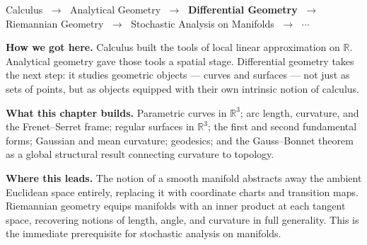 
\begin{tcolorbox}[
  colback=gray!6,
  colframe=gray!40,
  arc=2pt,
  left=8pt, right=8pt, top=6pt, bottom=6pt,
  title={\small\textbf{Where You Are in the Journey}},
  fonttitle=\small\bfseries
]
\begin{center}
\small
Calculus
$\;\to\;$ Analytical Geometry
$\;\to\;$ \textbf{Differential Geometry}
$\;\to\;$ Riemannian Geometry
$\;\to\;$ Stochastic Analysis on Manifolds
$\;\to\;$ $\cdots$
\end{center}

\medskip
\noindent\textbf{How we got here.}
Calculus built the tools of local linear approximation on
$\mathbb{R}$.
Analytical geometry gave those tools a spatial stage.
Differential geometry takes the next step: it studies
geometric objects --- curves and surfaces --- not just as sets
of points, but as objects equipped with their own intrinsic
notion of calculus.

\medskip
\noindent\textbf{What this chapter builds.}
Parametric curves in $\mathbb{R}^3$; arc length, curvature,
and the Frenet--Serret frame; regular surfaces in $\mathbb{R}^3$;
the first and second fundamental forms; Gaussian and mean
curvature; geodesics; and the Gauss--Bonnet theorem as
a global structural result connecting curvature to topology.

\medskip
\noindent\textbf{Where this leads.}
The notion of a smooth manifold abstracts away the ambient
Euclidean space entirely, replacing it with coordinate charts
and transition maps.
Riemannian geometry equips manifolds with an inner product at
each tangent space, recovering notions of length, angle, and
curvature in full generality.
This is the immediate prerequisite for stochastic analysis
on manifolds.
\end{tcolorbox}
\vspace{1em}

